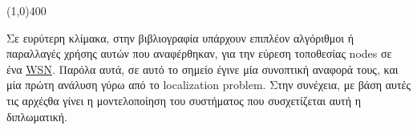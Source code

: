 \vspace{3\baselineskip}
\begin{center}
	\line(1,0){400}
\end{center}
\vspace{3\baselineskip}
Σε ευρύτερη κλίμακα, στην βιβλιογραφία υπάρχουν επιπλέον αλγόριθμοι ή παραλλαγές χρήσης αυτών που αναφέρθηκαν, για την εύρεση τοποθεσίας
nodes σε ένα \hyperref[abbr:WSN]{WSN}. Παρόλα αυτά, σε αυτό το σημείο έγινε μία συνοπτική αναφορά τους,  και μία πρώτη
ανάλυση γύρω από το localization problem. Στην συνέχεια,
με βάση αυτές τις αρχές\udot θα γίνει η μοντελοποίηση του συστήματος που συσχετίζεται αυτή η διπλωματική. 